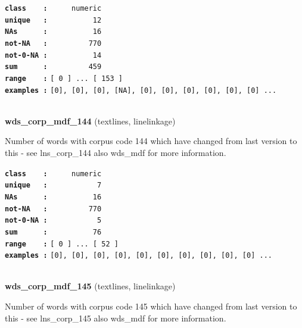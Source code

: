 \documentclass[]{article}
\begin{document}
\textbf{\texttt{class\ \ \ \ :}} \texttt{~~~~~numeric}\\
\textbf{\texttt{unique\ \ \ :}} \texttt{~~~~~~~~~~12}\\
\textbf{\texttt{NAs\ \ \ \ \ \ :}} \texttt{~~~~~~~~~~16}\\
\textbf{\texttt{not-NA\ \ \ :}} \texttt{~~~~~~~~~770}\\
\textbf{\texttt{not-0-NA\ :}} \texttt{~~~~~~~~~~14}\\
\textbf{\texttt{sum\ \ \ \ \ \ :}} \texttt{~~~~~~~~~459}\\
\textbf{\texttt{range\ \ \ \ :}}
\texttt{{[}\ 0\ {]}\ ...\ {[}\ 153\ {]}}\\
\textbf{\texttt{examples\ :}}
\texttt{{[}0{]},\ {[}0{]},\ {[}0{]},\ {[}NA{]},\ {[}0{]},\ {[}0{]},\ {[}0{]},\ {[}0{]},\ {[}0{]},\ {[}0{]}\ ...}\\

~

\textbf{wds\_corp\_mdf\_144} (textlines, linelinkage)

Number of words with corpus code 144 which have changed from last
version to this - see lns\_corp\_144 also wds\_mdf for more information.

\textbf{\texttt{class\ \ \ \ :}} \texttt{~~~~~numeric}\\
\textbf{\texttt{unique\ \ \ :}} \texttt{~~~~~~~~~~~7}\\
\textbf{\texttt{NAs\ \ \ \ \ \ :}} \texttt{~~~~~~~~~~16}\\
\textbf{\texttt{not-NA\ \ \ :}} \texttt{~~~~~~~~~770}\\
\textbf{\texttt{not-0-NA\ :}} \texttt{~~~~~~~~~~~5}\\
\textbf{\texttt{sum\ \ \ \ \ \ :}} \texttt{~~~~~~~~~~76}\\
\textbf{\texttt{range\ \ \ \ :}}
\texttt{{[}\ 0\ {]}\ ...\ {[}\ 52\ {]}}\\
\textbf{\texttt{examples\ :}}
\texttt{{[}0{]},\ {[}0{]},\ {[}0{]},\ {[}0{]},\ {[}0{]},\ {[}0{]},\ {[}0{]},\ {[}0{]},\ {[}0{]},\ {[}0{]}\ ...}\\

~

\textbf{wds\_corp\_mdf\_145} (textlines, linelinkage)

Number of words with corpus code 145 which have changed from last
version to this - see lns\_corp\_145 also wds\_mdf for more information.
\end{document}
